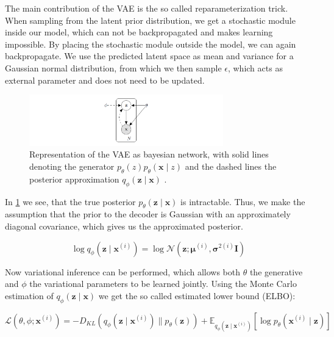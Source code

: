 The main contribution of the VAE is the so called reparameterization trick. When sampling from the latent prior distribution, we get a stochastic module inside our model, which can not be backpropagated and makes learning impossible. By placing the stochastic module outside the model, we can again backpropagate. We use the predicted latent space as mean and variance for a Gaussian normal distribution, from which we then sample $\epsilon$, which acts as external parameter and does not need to be updated.

\begin{figure}[h]
    \centering
    \includegraphics[width=0.75\textwidth]{data/images/repaTrick.png}
    \caption{Representation of the VAE as bayesian network, with solid lines denoting the generator $p_{{\theta}}(z)p_{{\theta}}(\mathbf{x} \mid z)$ and the dashed lines the posterior approximation $q_{\phi}(\mathbf{z} \mid \mathbf{x})$ \cite{kingma_auto-encoding_2014}.}
    \label{fig:varinference}
\end{figure}

In \ref{fig:varinference} we see, that the true posterior $p_{{\theta}}(\mathbf{z} \mid \mathbf{x})$ is intractable. Thus, we make the assumption that the prior to the decoder is Gaussian with an approximately diagonal covariance, which gives us the approximated posterior.

\begin{equation}
    \log q_{\phi}\left(\mathbf{z} \mid \mathbf{x}^{(i)}\right)=\log \mathcal{N}\left(\mathbf{z} ; \boldsymbol{\mu}^{(i)}, \boldsymbol{\sigma}^{2(i)} \mathbf{I}\right)
\end{equation}
    
Now variational inference can be performed, which allows both $\theta$ the generative and $\phi$ the variational parameters to be learned jointly. Using the Monte Carlo estimation of $q_{\phi}(\mathbf{z} \mid \mathbf{x})$ we get the so called estimated lower bound (ELBO):

\begin{equation}
    \mathcal{L}\left({\theta}, {\phi} ; \mathbf{x}^{(i)}\right)=-D_{K L}\left(q_{{\phi}}\left(\mathbf{z} \mid \mathbf{x}^{(i)}\right) \| p_{{\theta}}(\mathbf{z})\right)+\mathbb{E}_{q_{\phi}\left(\mathbf{z} \mid \mathbf{x}^{(i)}\right)}\left[\log p_{{\theta}}\left(\mathbf{x}^{(i)} \mid \mathbf{z}\right)\right]
    \label{eq3:elbo}
\end{equation}

